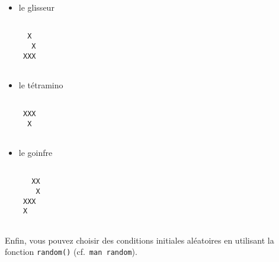 \begin{exercice}
\begin{itemize}
\begin{verbatim}
 XXX 
     
\end{verbatim}
  \item le glisseur
\begin{verbatim}
     
  X  
   X 
 XXX 
     
\end{verbatim}
  \item le t\'etramino
\begin{verbatim}
     
 XXX 
  X  
     
\end{verbatim}
  \item le goinfre
\begin{verbatim}
      
   XX 
    X 
 XXX  
 X    
      
\end{verbatim}
  \end{itemize}
  Enfin, vous pouvez choisir des  conditions initiales al\'eatoires en
  utilisant la fonction \texttt{random()} (cf.\ \texttt{man random}).
  \Ifcorrection
  \begin{correction}
    
  \end{correction}
  \fi
\end{exercice}
